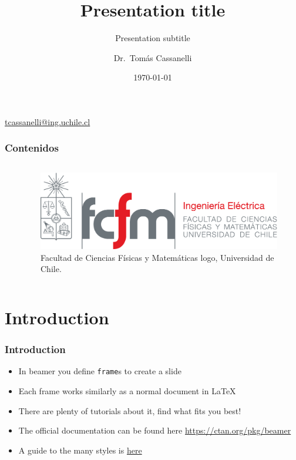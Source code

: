 \documentclass[
    10pt,
    aspectratio=169,
    xcolor={dvipsnames},
    spanish,
    ]{beamer}
\title[EL3103]{\bfseries Presentation title}
\subtitle{Presentation subtitle}
\author[Cassanelli]{Dr.~Tomás Cassanelli}
\institute[UChile]{Department of Electrical Engineering \\ Universidad de Chile}
\date{\today}
\begin{document}
\begin{frame}
  \titlepage
  \centering
   \href{mailto:tcassanelli@ing.uchile.cl}{tcassanelli@ing.uchile.cl} \hspace{.2cm}
\end{frame}

\begin{frame}
  \frametitle{Contenidos}
  \centering
  \begin{columns}
    \begin{column}{0.4\textwidth}
      \tableofcontents
    \end{column}
    \begin{column}{0.5\textwidth}
      \begin{figure}
        \centering
        \includegraphics[width=\textwidth]{fcfm_die}
        \caption{Facultad de Ciencias Físicas y Matemáticas logo, Universidad de Chile.}
      \end{figure}
    \end{column}
  \end{columns}  
\end{frame}

\section{Introduction}

\begin{frame}
  \frametitle{Introduction}
  \begin{itemize}
    \item In beamer you define \texttt{frame}s to create a slide
    \item Each frame works similarly as a normal document in \LaTeX
    \item There are plenty of tutorials about it, find what fits you best! 
    \item The official documentation can be found here \url{https://ctan.org/pkg/beamer}
    \item A guide to the many styles is \href{https://web.mit.edu/rsi/www/pdfs/beamer-tutorial.pdf}{here}
  \end{itemize}
\end{frame}
\end{document}
